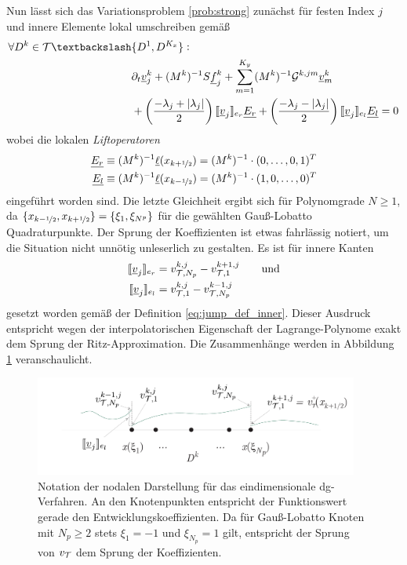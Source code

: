 Nun lässt sich das Variationsproblem \ref{prob:strong} zunächst für festen Index $j$ und innere Elemente lokal umschreiben gemäß
\begin{equation}
  \begin{aligned}
    \forall D^k\in\mathcal{T} \textbackslash &\{D^1,D^{K_x}\} : \\
      &\partial_t \underline{v}_j^k + (M^k)^{-1}S \underline{f}_j^k + \sum_{m=1}^{K_y} (M^k)^{-1}\drift^{k,jm}\underline{v}_m^k \\
      &+ \left(\frac{-\lambda_j + |\lambda_j|}{2}\right) \jump{\underline{v}_j}_{e_r}\underline{E_r} +
         \left(\frac{-\lambda_j - |\lambda_j|}{2}\right) \jump{\underline{v}_j}_{e_l}\underline{E_l} = 0
  \end{aligned}
  \label{eq:schema1}
\end{equation}
wobei die lokalen \emph{Liftoperatoren}
\begin{equation}
  \begin{aligned}
    \underline{E_r} &\equiv (M^k)^{-1}\underline{\ell}(x_{k+\nicefrac{1}{2}}) = (M^k)^{-1}  \cdot (0,\dots,0,1)^T \\
    \underline{E_l} &\equiv (M^k)^{-1}\underline{\ell}(x_{k-\nicefrac{1}{2}}) = (M^k)^{-1}  \cdot (1,0,\dots,0)^T
  \end{aligned}
\end{equation}
eingeführt worden sind. Die letzte Gleichheit ergibt sich für Polynomgrade $N\geq{1}$, da ${ \{x_{k-\nicefrac{1}{2}}, x_{k+\nicefrac{1}{2}}\} = \{\xi_1, \xi_{N^p} \} }$ für die gewählten Gauß-Lobatto Quadraturpunkte. Der Sprung der Koeffizienten ist etwas fahrlässig notiert, um die Situation nicht unnötig unleserlich zu gestalten. Es ist für innere Kanten
\begin{align*}
  \llbracket \underline{v}_j \rrbracket_{e_r} &= v_{\mathcal{T},N_p}^{k,j} - v_{\mathcal{T},1}^{k+1,j} \qquad \text{und} \\
  \llbracket \underline{v}_j \rrbracket_{e_l} &= v_{\mathcal{T},1}^{k,j} - v_{\mathcal{T},N_p}^{k-1,j}
\end{align*}
gesetzt worden gemäß der Definition \eqref{eq:jump_def_inner}. Dieser Ausdruck entspricht wegen der interpolatorischen Eigenschaft der Lagrange-Polynome exakt dem Sprung der Ritz-Approximation. Die Zusammenhänge werden in Abbildung \ref{fig:notationDG2} veranschaulicht.
\begin{figure}
  \centering
  \includegraphics[width=0.95\textwidth]{files/notationDG2.pdf}
  \caption{Notation der nodalen Darstellung für das eindimensionale \ac{dg}-Verfahren. An den Knotenpunkten entspricht der Funktionswert gerade den Entwicklungskoeffizienten. Da für Gauß-Lobatto Knoten mit $N_p\geq 2$ stets $\xi_1=-1$ und $\xi_{N_p}=1$ gilt, entspricht der Sprung von $v_{\mathcal{T}}$ dem Sprung der Koeffizienten.}
  \label{fig:notationDG2}
\end{figure}

